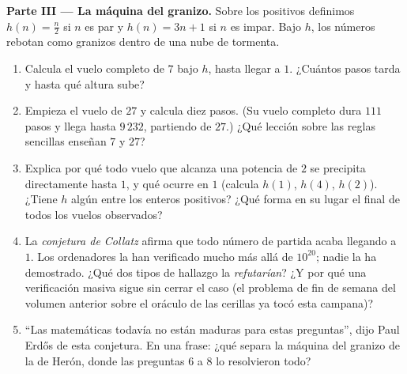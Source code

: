 \begin{problem}
\medskip
\noindent\textbf{Parte III --- La máquina del granizo.}
Sobre los  positivos definimos $h(n) = \frac n2$ si $n$ es
par y $h(n) = 3n + 1$ si $n$ es impar. Bajo $h$, los números rebotan como
granizos dentro de una nube de tormenta.
\begin{enumerate}[resume]
  \item Calcula el vuelo completo de $7$ bajo $h$, hasta llegar a $1$.
        ¿Cuántos pasos tarda y hasta qué altura sube?
  \item Empieza el vuelo de $27$ y calcula diez pasos. (Su vuelo completo
        dura $111$ pasos y llega hasta $9\,232$, partiendo de $27$.) ¿Qué
        lección sobre las reglas sencillas enseñan $7$ y $27$?
  \item Explica por qué todo vuelo que alcanza una potencia de $2$ se
        precipita directamente hasta $1$, y qué ocurre en $1$ (calcula
        $h(1)$, $h(4)$, $h(2)$). ¿Tiene $h$ algún  entre los
        enteros positivos? ¿Qué forma en su lugar el final de todos los
        vuelos observados?
  \item La \emph{conjetura de Collatz} afirma que todo número de partida
        acaba llegando a $1$. Los ordenadores la han verificado mucho más
        allá de $10^{20}$; nadie la ha demostrado. ¿Qué dos tipos de
        hallazgo la \emph{refutarían}? ¿Y por qué una verificación masiva
        sigue sin cerrar el caso (el problema de fin de semana del volumen
        anterior sobre el oráculo de las cerillas ya tocó esta campana)?
  \item ``Las matemáticas todavía no están maduras para estas
        preguntas'', dijo Paul Erd\H{o}s de esta conjetura. En una frase:
        ¿qué separa la máquina del granizo de la de Herón, donde las
        preguntas 6 a 8 lo resolvieron todo?
\end{enumerate}


\end{problem}
